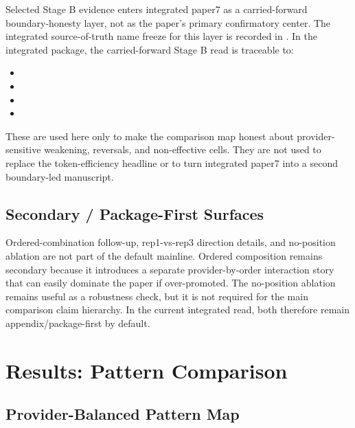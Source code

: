 \documentclass[11pt,a4paper]{article}
\begin{document}
Selected Stage B evidence enters integrated paper7 as a carried-forward boundary-honesty layer, not as the paper's primary confirmatory center. The integrated source-of-truth name freeze for this layer is recorded in . In the integrated package, the carried-forward Stage B read is traceable to:
\begin{itemize}
  \item {}
  \item {}
  \item {}
  \item {}
\end{itemize}
These are used here only to make the comparison map honest about provider-sensitive weakening, reversals, and non-effective cells. They are not used to replace the token-efficiency headline or to turn integrated paper7 into a second boundary-led manuscript.

\subsection{Secondary / Package-First Surfaces}

Ordered-combination follow-up, rep1-vs-rep3 direction details, and no-position ablation are not part of the default mainline. Ordered composition remains secondary because it introduces a separate provider-by-order interaction story that can easily dominate the paper if over-promoted. The no-position ablation remains useful as a robustness check, but it is not required for the main comparison claim hierarchy. In the current integrated read, both therefore remain appendix/package-first by default.

\section{Results: Pattern Comparison}
\label{sec:results_comparison}

\subsection{Provider-Balanced Pattern Map}
\end{document}
